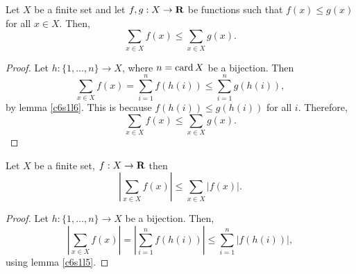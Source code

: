 \begin{lem}\label{c6s1l14}
Let $X$ be a finite set and let $f, g: X \rightarrow \mathbf{R}$ be functions
such that $f(x) \le g(x)$ for all $x \in X$. Then,
\[
\sum_{x \in X}f(x) \le \sum_{x \in X}g(x).
\]
\end{lem}
\begin{proof}
Let $h:\{1, \ldots, n\} \rightarrow X$, where $n = \operatorname{card}{X}$ be a bijection.
Then 
\[
\sum_{x \in X}f(x) = \sum_{i=1}^n f(h(i)) \le \sum_{i=1}^n g(h(i)),
\]
by lemma \ref{c6s1l6}. This is because $f(h(i)) \le g(h(i))$ for all $i$.
Therefore,
\[
\sum_{x \in X}f(x) \le \sum_{x \in X}g(x).
\]
\end{proof}

\begin{lem}\label{c6s1l15}
Let $X$ be a finite set, $f:X \rightarrow \mathbf{R}$ then
\[
\left|\sum_{x \in X}f(x)\right| \le \sum_{x \in X}|f(x)|.
\]
\end{lem}
\begin{proof}
Let $h:\{1, \ldots, n\} \rightarrow X$ be a bijection. Then,
\[
\left|\sum_{x \in X}f(x)\right| = \left|\sum_{i=1}^n f(h(i))\right| \le
\sum_{i=1}^n |f(h(i))|,
\]
using lemma \ref{c6s1l5}.
\end{proof}

